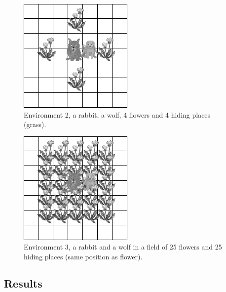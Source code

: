 \documentclass{aamas2012}
\begin{document}
	\begin{figure}
		\centering
		\includegraphics[keepaspectratio=true, scale=0.5]{environment_2.png}
		\caption
		{
			\label{environment_2}
			Environment 2, a rabbit, a wolf, 4 flowers and 4 hiding places (grass).
		}
	\end{figure}
	
	\begin{figure}
		\centering
		\includegraphics[keepaspectratio=true, scale=0.5]{environment_3.png}
		\caption
		{
			\label{environment_3}
			Environment 3, a rabbit and a wolf in a field of 25 flowers and 25 hiding places (same position as flower).
		}
	\end{figure}
	
\subsection{Results}
\end{document}
